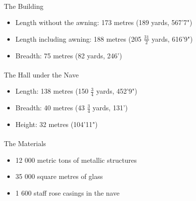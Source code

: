 \documentclass[
10pt, %
a4paper, %
oneside, %
headinclude,footinclude, %
BCOR5mm, %
]{scrartcl}
\theoremstyle{definition} %
\theoremstyle{plain} %
\theoremstyle{remark} %
\begin{document}
\paragraph{}The Building
\begin{itemize}
	\item Length without the awning: 173 metres (189 yards, 567'7")
	\item Length including awning: 188 metres (205 $\frac{31}{2}$ yards, 616'9")
	\item Breadth: 75 metres (82 yards, 246')
\end{itemize}


\paragraph{}The Hall under the Nave
\begin{itemize}
	\item Length: 138 metres (150 $\frac{3}{4}$ yards, 452'9")
	\item Breadth: 40 metres (43 $\frac{3}{4}$ yards, 131')
	\item Height: 32 metres (104'11")
\end{itemize}

\paragraph{}The Materials
\begin{itemize}
	\item 12 000 metric tons of metallic structures
	\item 35 000 square metres of glass
	\item 1 600 staff rose casings in the nave
\end{itemize}

%
\end{document}
